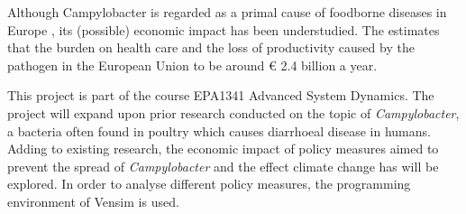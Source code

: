 \iffalse
1.	Establish field  -> Z
    a.	Societal relevance
2.	Outline problem in the field (Elias)
    a.	Scientific relevance
3.	Present solution to problem in the field
    a.	Problem statement/research question -> Z
    b.	Explain relevance of simulation method (Elias) considering the problem
4.	Reading guide -> Z

Target: 1000 words\
♫♪.ılılıll|̲̅̅●̲̅̅|̲̅̅=̲̅̅|̲̅̅●̲̅̅|llılılı.♫♪
\fi

Although Campylobacter is regarded as a primal cause of foodborne diseases in Europe \parencite{european_food_safety_authority_european_2019}
, its (possible) economic impact has been understudied. The \citeauthor{european_food_safety_authority_campylobacter_nodate} estimates that the burden on health care and the loss of productivity caused by the pathogen in the European Union to be around \euro{} 2.4 billion a year.  %




This project is part of the course EPA1341 Advanced System Dynamics. The project will expand upon prior research conducted on the topic of \textit{Campylobacter}, a bacteria often found in poultry which causes diarrhoeal disease in humans. Adding to existing research, the economic impact of policy measures aimed to prevent the spread of  \textit{Campylobacter} and the effect climate change has will be explored. In order to analyse different policy measures, the programming environment of Vensim is used. 

